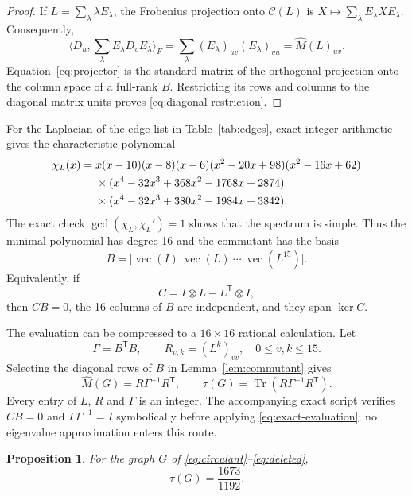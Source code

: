 \documentclass[11pt]{article}
\newtheorem{proposition}{Proposition}
\newcommand{\Mhat}{\widehat M}
\newcommand{\Tr}{\operatorname{Tr}}
\newcommand{\vecop}{\operatorname{vec}}
\begin{document}
\begin{proof}
If $L=\sum_\lambda\lambda E_\lambda$, the Frobenius projection onto
$\mathcal C(L)$ is $X\mapsto\sum_\lambda E_\lambda X E_\lambda$.
Consequently,
\[
  \langle D_u,\sum_\lambda E_\lambda D_vE_\lambda\rangle_F
  =\sum_\lambda(E_\lambda)_{uv}(E_\lambda)_{vu}
  =\Mhat(L)_{uv}.
\]
Equation~\eqref{eq:projector} is the standard matrix of the orthogonal
projection onto the column space of a full-rank $B$.  Restricting its rows and
columns to the diagonal matrix units proves
\eqref{eq:diagonal-restriction}.
\end{proof}

For the Laplacian of the edge list in Table~\ref{tab:edges}, exact integer
arithmetic gives the characteristic polynomial
\begin{align}
\chi_L(x)={}&x(x-10)(x-8)(x-6)(x^2-20x+98)(x^2-16x+62)\notag\\
&\times(x^4-32x^3+368x^2-1768x+2874)\notag\\
&\times(x^4-32x^3+380x^2-1984x+3842).
\label{eq:charpoly}
\end{align}
The exact check $\gcd(\chi_L,\chi_L')=1$ shows that the spectrum is simple.
Thus the minimal polynomial has degree 16 and the commutant has the basis
\begin{equation}
  B=\bigl[\vecop(I)\ \vecop(L)\ \cdots\ \vecop(L^{15})\bigr].
  \label{eq:power-basis}
\end{equation}
Equivalently, if
\[
  C=I\otimes L-L^{\mathsf T}\otimes I,
\]
then $CB=0$, the 16 columns of $B$ are independent, and they span
$\ker C$.

The evaluation can be compressed to a $16\times16$ rational calculation.
Let
\begin{equation}
  \Gamma=B^{\mathsf T}B,
  \qquad
  R_{v,k}=(L^k)_{vv},\quad 0\le v,k\le15.
  \label{eq:gram-moments}
\end{equation}
Selecting the diagonal rows of $B$ in Lemma~\ref{lem:commutant} gives
\begin{equation}
  \Mhat(G)=R\Gamma^{-1}R^{\mathsf T},
  \qquad
  \tau(G)=\Tr\!\left(R\Gamma^{-1}R^{\mathsf T}\right).
  \label{eq:exact-evaluation}
\end{equation}
Every entry of $L$, $R$ and $\Gamma$ is an integer.  The accompanying exact
script verifies $CB=0$ and $\Gamma\Gamma^{-1}=I$ symbolically before applying
\eqref{eq:exact-evaluation}; no eigenvalue approximation enters this route.

\begin{proposition}
For the graph $G$ of \eqref{eq:circulant}--\eqref{eq:deleted},
\[
  \tau(G)=\frac{1673}{1192}.
\]
\end{proposition}
\end{document}
